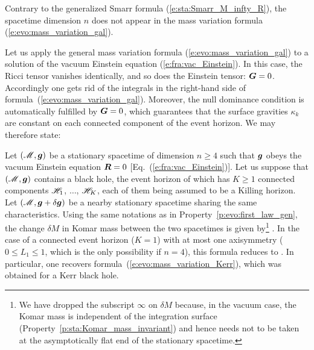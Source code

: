 \begin{remark}
Contrary to the generalized Smarr formula (\ref{e:sta:Smarr_M_infty_R}), the spacetime dimension $n$ does not appear in the mass variation
formula (\ref{e:evo:mass_variation_gal}).
\end{remark}

Let us apply the general mass variation formula (\ref{e:evo:mass_variation_gal})
to a solution of the vacuum Einstein equation (\ref{e:fra:vac_Einstein}).
In this case, the Ricci tensor vanishes identically, and so does the Einstein tensor: $\bm{G} = 0$.
Accordingly one gets rid of the integrals in the
right-hand side of formula~(\ref{e:evo:mass_variation_gal}). Moreover,
the null dominance condition is automatically fulfilled by $\bm{G}=0$,
which guarantees that the surface gravities
$\kappa_k$ are constant on each connected component of the event horizon. We may therefore state:

\begin{prop}
\label{p:evo:first_vac_GR}
Let $(\mathscr{M},\bm{g})$ be a stationary spacetime of dimension $n\geq 4$ such that $\bm{g}$ obeys
the vacuum Einstein equation $\bm{R} = 0$ [Eq.~(\ref{e:fra:vac_Einstein})]. Let us
suppose that $(\mathscr{M},\bm{g})$ contains a black
hole, the event horizon of which has $K \geq 1$ connected components
$\mathscr{H}_{1}$, $\ldots$, $\mathscr{H}_{K}$, each of them being assumed to be a Killing horizon.
Let $(\mathscr{M},\bm{g}+\delta\bm{g})$ be a nearby stationary spacetime sharing the same characteristics.
Using the same notations as in Property~\ref{p:evo:first_law_gen}, the
change $\delta M$ in Komar mass between the two spacetimes
is given by\footnote{We have dropped the subscript $\infty$ on $\delta M$ because, in
the vacuum case, the Komar mass is independent of the integration surface
(Property~\ref{p:sta:Komar_mass_invariant}) and hence needs not to be taken at the asymptotically flat
end of the stationary spacetime.}
\be \label{e:evo:mass_variation_vacuum}
    .
\ee
In the case of a connected event horizon ($K=1$)
with at most one axisymmetry ($0 \leq L_1 \leq 1$, which is the only possibility if $n=4$),
this formula reduces to
\be \label{e:evo:mass_variation_vacuum_n4}
    .
\ee
In particular, one recovers formula~(\ref{e:evo:mass_variation_Kerr}), which was obtained
for a Kerr black hole.
\end{prop}


